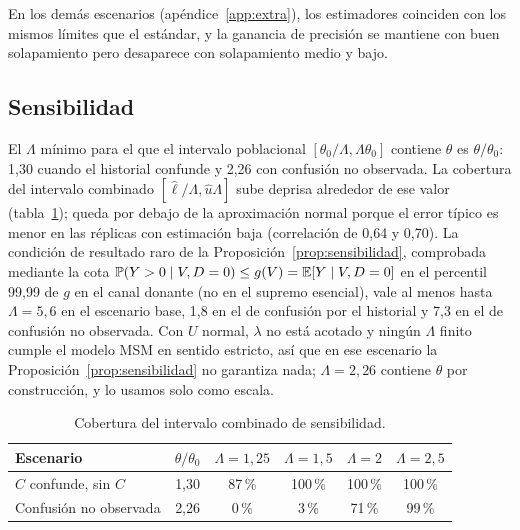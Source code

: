 En los demás escenarios (apéndice~\ref{app:extra}), los estimadores coinciden con los mismos límites que el estándar, y la ganancia de precisión se mantiene con buen solapamiento pero desaparece con solapamiento medio y bajo.

\subsection{Sensibilidad}\label{sec:res-sensibilidad}

El $\Lambda$ mínimo para el que el intervalo poblacional $[\theta_0/\Lambda,\Lambda\theta_0]$ contiene $\theta$ es $\theta/\theta_0$: 1,30 cuando el historial confunde y 2,26 con confusión no observada. La cobertura del intervalo combinado $[\hat\ell/\Lambda,\hat u\Lambda]$ sube deprisa alrededor de ese valor (tabla~\ref{tab:sensibilidad}); queda por debajo de la aproximación normal porque el error típico es menor en las réplicas con estimación baja (correlación de 0,64 y 0,70). La condición de resultado raro de la Proposición~\ref{prop:sensibilidad}, comprobada mediante la cota $\mathbb{P}(Y>0\mid V,D=0)\le g(V)=\mathbb{E}[Y\mid V,D=0]$ en el percentil 99,99 de $g$ en el canal donante (no en el supremo esencial), vale al menos hasta $\Lambda=5,6$ en el escenario base, 1,8 en el de confusión por el historial y 7,3 en el de confusión no observada. Con $U$ normal, $\lambda$ no está acotado y ningún $\Lambda$ finito cumple el modelo MSM en sentido estricto, así que en ese escenario la Proposición~\ref{prop:sensibilidad} no garantiza nada; $\Lambda=2,26$ contiene $\theta$ por construcción, y lo usamos solo como escala.

\begin{table}[ht]
\centering\small
\caption{Cobertura del intervalo combinado de sensibilidad.}\label{tab:sensibilidad}
\begin{tabular}{@{}lccccc@{}}
\toprule
Escenario & $\theta/\theta_0$ & $\Lambda=1,25$ & $\Lambda=1,5$ & $\Lambda=2$ & $\Lambda=2,5$ \\
\midrule
$C$ confunde, sin $C$ & 1,30 & 87\,\% & 100\,\% & 100\,\% & 100\,\% \\
Confusión no observada & 2,26 & 0\,\% & 3\,\% & 71\,\% & 99\,\% \\
\bottomrule
\end{tabular}
\end{table}

